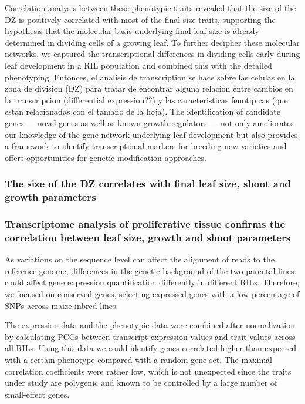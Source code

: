 \documentclass[a4paper,10pt]{article}
\begin{document}
Correlation analysis between these phenotypic traits revealed that the size of the DZ is positively correlated with most of the final size traits, supporting the hypothesis that the molecular basis underlying final leaf size is already determined in
dividing cells of a growing leaf. To further decipher these molecular networks, we captured the transcriptional differences in dividing cells early during leaf development in a RIL population and combined this with the detailed phenotyping.
Entonces, el analisis de transcription se hace sobre las celulas en la zona de division (DZ) para tratar de encontrar alguna relacion entre cambios en la transcripcion (differential expression??) y las caracteristicas fenotipicas (que estan relacionadas con el tamaño de la hoja).
The identification of candidate genes — novel genes as well as known growth regulators — not only ameliorates our knowledge of the gene network underlying leaf development but also provides a framework to identify transcriptional markers for
breeding new varieties and offers opportunities for genetic modification approaches.




\subsubsection{The size of the DZ correlates with final leaf size, shoot and growth parameters}


\subsubsection{Transcriptome analysis of proliferative tissue confirms the correlation between leaf size, growth and shoot parameters}
As variations on the sequence level can affect the alignment of reads to the reference genome, differences in the genetic background of the two parental lines could affect gene expression quantification
differently in different RILs. Therefore, we focused on conserved genes, selecting expressed genes with a low percentage of SNPs across maize inbred lines. 

The expression data and the phenotypic data were combined after normalization by calculating PCCs between transcript expression values and trait values across all RILs.
Using this data we could identify genes correlated higher than expected with a certain phenotype compared with a random gene set.
The maximal correlation coefficients were rather low, which is not unexpected since the traits under study are polygenic and known to be controlled by a large number of small-effect genes.
\end{document}
